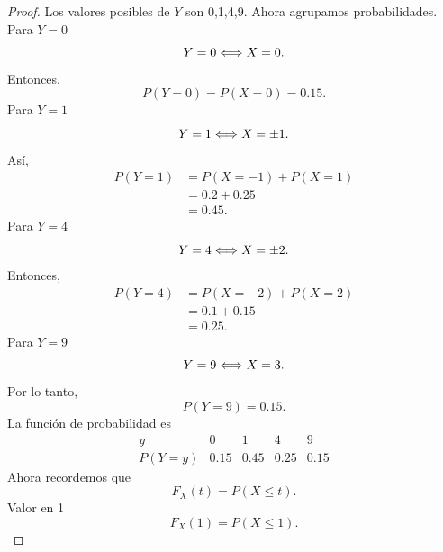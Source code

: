 \documentclass[12pt,a4paper]{article}
\begin{document}
    \begin{proof}
        Los valores posibles de $Y$ son 0,1,4,9. Ahora agrupamos probabilidades. Para $Y=0$
        \begin{equation*}
            Y=0\Longleftrightarrow X=0.
        \end{equation*}
        Entonces,
        \begin{equation*}
            P(Y=0)=P(X=0)=0.15.
        \end{equation*}
        Para $Y=1$
        \begin{equation*}
            Y=1\Longleftrightarrow X=\pm1.
        \end{equation*}
        Así,
        \begin{align*}
            P(Y=1)&=P(X=-1)+P(X=1)\\
            &=0.2+0.25\\
            &=0.45.
        \end{align*}
        Para $Y=4$
        \begin{equation*}
            Y=4\Longleftrightarrow X=\pm2.
        \end{equation*}
        Entonces,
        \begin{align*}
            P(Y=4)&=P(X=-2)+P(X=2)\\
            &=0.1+0.15\\
            &=0.25.
        \end{align*}
        Para $Y=9$
        \begin{equation*}
            Y=9\Longleftrightarrow X=3.
        \end{equation*}
        Por lo tanto,
        \begin{equation*}
            P(Y=9)=0.15.
        \end{equation*}
        La función de probabilidad es
            \begin{equation*}
                \begin{array}{c|cccc}
                y & 0 & 1 & 4 & 9\\
                \hline
                P(Y=y) & 0.15 & 0.45 & 0.25 & 0.15
            \end{array}
        \end{equation*}
        Ahora recordemos que
        \begin{equation*}
            F_{X}(t)=P(X\leq t).
        \end{equation*}
        Valor en 1
        \begin{equation*}
            F_{X}(1)=P(X\leq1).
        \end{equation*}

\end{proof}
\end{document}
